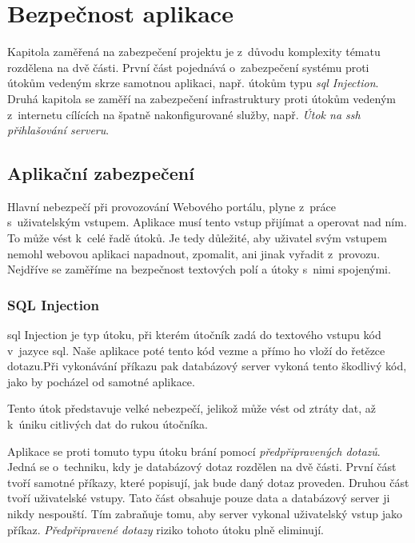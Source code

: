 \section{Bezpečnost aplikace}
\label{sec:security}

Kapitola zaměřená na zabezpečení projektu \bso{} je z~důvodu komplexity tématu rozdělena na dvě části.  První část pojednává o~zabezpečení systému proti útokům vedeným skrze samotnou aplikaci, např. útokům typu \emph{\acrshort{sql} Injection}. Druhá kapitola se zaměří na zabezpečení infrastruktury proti útokům vedeným z~internetu cílících na špatně nakonfigurované služby, např. \emph{Útok na \acrshort{ssh} přihlašování serveru}.

\subsection{Aplikační zabezpečení}

Hlavní nebezpečí při provozování Webového portálu, plyne z~práce s~uživatelským vstupem. Aplikace musí tento vstup přijímat a operovat nad ním. To může vést k~celé řadě útoků. Je tedy důležité, aby uživatel svým vstupem nemohl webovou aplikaci napadnout, zpomalit, ani jinak vyřadit z~provozu. Nejdříve se zaměříme na bezpečnost textových polí a útoky s~nimi spojenými.

\subsubsection{SQL Injection}

\acrshort{sql} Injection\cite{sqlinject} je typ útoku, při kterém útočník zadá do textového vstupu kód v~jazyce \acrshort{sql}. Naše aplikace poté tento kód vezme a přímo ho vloží do řetězce dotazu.Při vykonávání příkazu pak databázový server vykoná tento škodlivý kód, jako by pocházel od samotné aplikace.

Tento útok představuje velké nebezpečí, jelikož může vést od ztráty dat, až k~úniku citlivých dat do rukou útočníka.

Aplikace \bso{} se proti tomuto typu útoku brání pomocí \emph{předpřipravených dotazů}\cite{mysqlprepstmt}. Jedná se o~techniku, kdy je databázový dotaz rozdělen na dvě části. První část tvoří samotné příkazy, které popisují, jak bude daný dotaz proveden. Druhou část tvoří uživatelské vstupy. Tato část obsahuje pouze data a databázový server ji nikdy nespouští. Tím zabraňuje tomu, aby server vykonal uživatelský vstup jako příkaz. \emph{Předpřipravené dotazy}\cite{mysqlprepstmt} riziko tohoto útoku plně eliminují.

